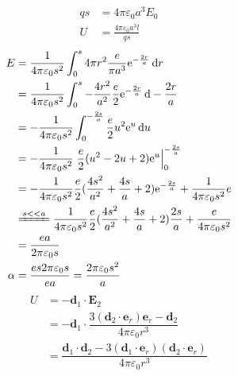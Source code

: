 \begin{align*}
    qs&=4\pi\varepsilon_0 a^3 E_0\\
    U&=\frac{4\pi\varepsilon_0 a^3l}{qs} 
\end{align*}
\begin{align*}
    E&=\frac{1}{4\pi\varepsilon_0s^2}\int_{0}^{s}4\pi r^2\dfrac{e}{\pi a^3}\mathrm{e}^{-\frac{2r}{a}}\dif r\\
    &=\frac{1}{4\pi\varepsilon_0s^2}\int_{0}^{s} -\frac{4r^2}{a^2}\dfrac{e}{2 }\mathrm{e}^{-\frac{2r}{a}}\dif -\frac{2r}{a}\\
    &=-\frac{1}{4\pi\varepsilon_0s^2}\int_{0}^{-\frac{2s}{a}} \dfrac{e}{2 }u^2\mathrm{e}^u\dif u\\
    &=-\frac{1}{4\pi\varepsilon_0s^2}\left. \dfrac{e}{2 }(u^2-2u+2)\mathrm{e}^u\right|_{0}^{-\frac{2s}{a}}\\
    &=-\frac{1}{4\pi\varepsilon_0s^2}\dfrac{e}{2}(\frac{4s^2}{a^2}+\frac{4s}{a}+2)\mathrm{e}^{-\frac{2s}{a}}+\frac{1}{4\pi\varepsilon_0s^2}{e}\\
    &\xlongequal{s<<a}\frac{1}{4\pi\varepsilon_0s^2}\dfrac{e}{2}(\frac{4s^2}{a^2}+\frac{4s}{a}+2)\frac{2s}{a}+\frac{e}{4\pi\varepsilon_0s^2}\\
    &=\frac{ea}{2\pi\varepsilon_0s}\\
    \alpha&=\frac{es2\pi\varepsilon_0s}{ea}=\frac{2\pi \varepsilon_0s^2}{a}
\end{align*}
\begin{align*}
    U&=-\boldsymbol{d}_1\cdot\boldsymbol{E}_2\\
    &=-\boldsymbol{d}_1\cdot\dfrac{3(\boldsymbol{d}_2\cdot\boldsymbol{e}_r)\boldsymbol{e}_r-\boldsymbol{d}_2}{4\pi\varepsilon_0r^3}\\
    &=\dfrac{\boldsymbol{d}_1\cdot\boldsymbol{d}_2-3(\boldsymbol{d}_1\cdot\boldsymbol{e}_r)(\boldsymbol{d}_2\cdot\boldsymbol{e}_r)}{4\pi\varepsilon_0r^3}
\end{align*}
